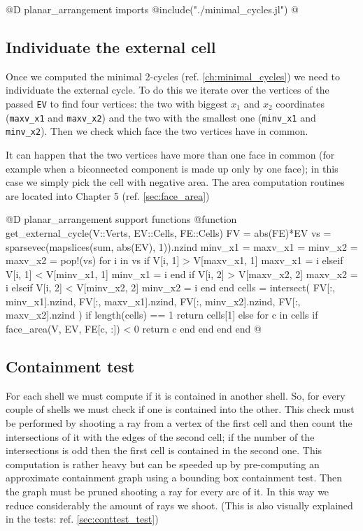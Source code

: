 @D planar\_arrangement imports
@{include("./minimal_cycles.jl")
@}

\subsection{Individuate the external cell}
Once we computed the minimal 2-cycles (ref. \ref{ch:minimal_cycles})
we need to individuate the external cycle. To do this we iterate over the
vertices of the passed \texttt{EV} to find four vertices: the two with biggest
$x_1$ and $x_2$ coordinates (\texttt{maxv\_x1} and \texttt{maxv\_x2}) and the 
two with the smallest one (\texttt{minv\_x1} and \texttt{minv\_x2}). 
Then we check which face the two vertices have in common. 

It can happen that the two vertices have more than one face in common
(for example when a biconnected component is made up only by one face);
in this case we simply pick the cell with negative area. The area
computation routines are located into Chapter 5 (ref. \ref{sec:face_area})


@D planar\_arrangement support functions
@{function get_external_cycle(V::Verts, EV::Cells, FE::Cells)
    FV = abs(FE)*EV
    vs = sparsevec(mapslices(sum, abs(EV), 1)).nzind
    minv_x1 = maxv_x1 = minv_x2 = maxv_x2 = pop!(vs)
    for i in vs
        if V[i, 1] > V[maxv_x1, 1]
            maxv_x1 = i
        elseif V[i, 1] < V[minv_x1, 1]
            minv_x1 = i
        end
        if V[i, 2] > V[maxv_x2, 2]
            maxv_x2 = i
        elseif V[i, 2] < V[minv_x2, 2]
            minv_x2 = i
        end
    end
    cells = intersect(
        FV[:, minv_x1].nzind, 
        FV[:, maxv_x1].nzind,
        FV[:, minv_x2].nzind,
        FV[:, maxv_x2].nzind
    )
    if length(cells) == 1
        return cells[1]
    else
        for c in cells
            if face_area(V, EV, FE[c, :]) < 0
                return c
            end
        end
    end
end
@}

\subsection{Containment test}

For each shell we must compute if it is contained
in another shell. So, for every couple of shells
we must check if one is contained into the other.
This check must be performed by shooting a ray from
a vertex of the first cell and then count the intersections
of it with the edges of the second cell; if the number 
of the intersections is odd then the first cell is contained
in the second one. This computation is rather heavy but can be
speeded up by pre-computing an approximate containment graph 
using a bounding box containment test. Then the graph must be
pruned shooting a ray for every arc of it. In this way we reduce
considerably the amount of rays we shoot. (This is also visually
explained in the tests: ref. \ref{sec:conttest_test})

